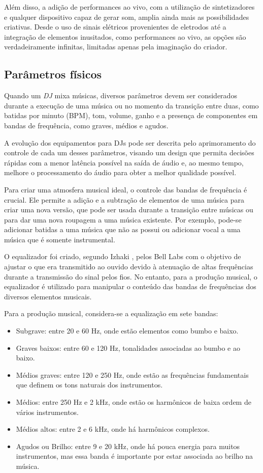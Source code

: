 Além disso, a adição de performances ao vivo, com a utilização de sintetizadores e qualquer dispositivo capaz de gerar som, amplia ainda mais as possibilidades criativas. Desde o uso de sinais elétricos provenientes de eletrodos até a integração de elementos inusitados, como performances ao vivo, as opções são verdadeiramente infinitas, limitadas apenas pela imaginação do criador.

\subsection{Parâmetros físicos}

Quando um \textit{DJ} mixa músicas, diversos parâmetros devem ser considerados durante a execução de uma música ou no momento da transição entre duas, como batidas por minuto (BPM), tom, volume, ganho e a presença de componentes em bandas de frequência, como graves, médios e agudos.

A evolução dos equipamentos para DJs pode ser descrita pelo aprimoramento do controle de cada um desses parâmetros, visando um design que permita decisões rápidas com a menor latência possível na saída de áudio e, ao mesmo tempo, melhore o processamento do áudio para obter a melhor qualidade possível.

Para criar uma atmosfera musical ideal, o controle das bandas de frequência é crucial. Ele permite a adição e a subtração de elementos de uma música para criar uma nova versão, que pode ser usada durante a transição entre músicas ou para dar uma nova roupagem a uma música existente. Por exemplo, pode-se adicionar batidas a uma música que não as possui ou adicionar vocal a uma música que é somente instrumental.

O equalizador foi criado, segundo Izhaki \cite{mixing}, pelos Bell Labs com o objetivo de ajustar o que era transmitido ao ouvido devido à atenuação de altas frequências durante a transmissão do sinal pelos fios. No entanto, para a produção musical, o equalizador é utilizado para manipular o conteúdo das bandas de frequências dos diversos elementos musicais. 

Para a produção musical, considera-se a equalização em sete bandas:

\begin{itemize}
	\item Subgrave: entre 20 e 60 Hz, onde estão elementos como bumbo e baixo.
	\item Graves baixos: entre 60 e 120 Hz, tonalidades associadas ao bumbo e ao baixo.
	\item Médios graves: entre 120 e 250 Hz, onde estão as frequências fundamentais que definem os tons naturais dos instrumentos.
	\item Médios: entre 250 Hz e 2 kHz, onde estão os harmônicos de baixa ordem de vários instrumentos.
	\item Médios altos: entre 2 e 6 kHz, onde há harmônicos complexos.
	\item Agudos ou Brilho: entre 9 e 20 kHz, onde há pouca energia para muitos instrumentos, mas essa banda é importante por estar associada ao brilho na música.
\end{itemize}

